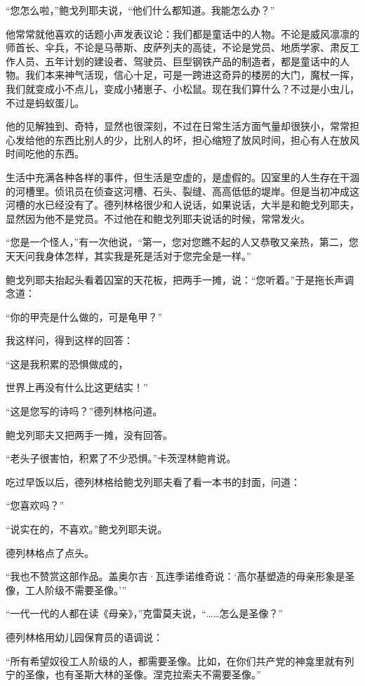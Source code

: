 “您怎么啦，”鲍戈列耶夫说，“他们什么都知道。我能怎么办？”

他常常就他喜欢的话题小声发表议论：我们都是童话中的人物。不论是威风凛凛的师首长、伞兵，不论是马蒂斯、皮萨列夫的高徒，不论是党员、地质学家、肃反工作人员、五年计划的建设者、驾驶员、巨型钢铁产品的制造者，都是童话中的人物。我们本来神气活现，信心十足，可是一跨进这奇异的楼房的大门，魔杖一挥，我们就变成小不点儿，变成小猪崽子、小松鼠。现在我们算什么？不过是小虫儿，不过是蚂蚁蛋儿。

他的见解独到、奇特，显然也很深刻，不过在日常生活方面气量却很狭小，常常担心发给他的东西比别人的少，比别人的坏，担心缩短了放风时间，担心有人在放风时间吃他的东西。

生活中充满各种各样的事件，但生活是空虚的，是虚假的。囚室里的人生存在干涸的河槽里。侦讯员在侦查这河槽、石头、裂缝、高高低低的堤岸。但是当初冲成这河槽的水已经没有了。德列林格很少和人说话，如果说话，大半是和鲍戈列耶夫，显然因为他不是党员。不过他在和鲍戈列耶夫说话的时候，常常发火。

“您是一个怪人，”有一次他说，“第一，您对您瞧不起的人又恭敬又亲热，第二，您天天问我身体怎样，其实我是死是活对于您完全是一样。”

鲍戈列耶夫抬起头看着囚室的天花板，把两手一摊，说：“您听着。”于是拖长声调念道：

“你的甲壳是什么做的，可是龟甲？”

我这样问，得到这样的回答：

“这是我积累的恐惧做成的，

世界上再没有什么比这更结实！”

“这是您写的诗吗？”德列林格问道。

鲍戈列耶夫又把两手一摊，没有回答。

“老头子很害怕，积累了不少恐惧。”卡茨涅林鲍肯说。

吃过早饭以后，德列林格给鲍戈列耶夫看了看一本书的封面，问道：

“您喜欢吗？”

“说实在的，不喜欢。”鲍戈列耶夫说。

德列林格点了点头。

“我也不赞赏这部作品。盖奥尔吉·瓦连季诺维奇说：‘高尔基塑造的母亲形象是圣像，工人阶级不需要圣像。’”

“一代一代的人都在读《母亲》，”克雷莫夫说，“……怎么是圣像？”

德列林格用幼儿园保育员的语调说：

“所有希望奴役工人阶级的人，都需要圣像。比如，在你们共产党的神龛里就有列宁的圣像，也有圣斯大林的圣像。涅克拉索夫不需要圣像。”

